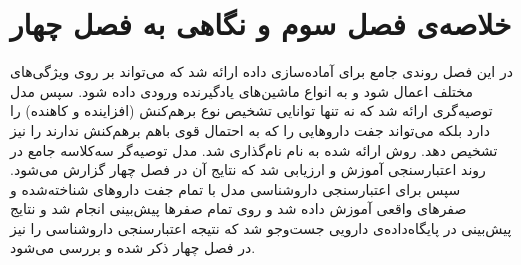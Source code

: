 \section*{خلاصه‌ی فصل سوم و نگاهی به فصل چهار}
در این فصل روندی جامع برای آماده‌سازی داده ارائه ‌شد که می‌تواند بر روی ویژگی‌های مختلف اعمال شود و به انواع ماشین‌های یادگیرنده ورودی داده ‌شود. سپس مدل توصیه‌گری ارائه شد که نه تنها توانایی تشخیص نوع برهم‌کنش (افزاینده و کاهنده) را دارد بلکه می‌تواند جفت داروهایی را که به احتمال قوی باهم برهم‌کنش ندارند را نیز تشخیص دهد. روش ارائه شده به نام 
نام‌گذاری شد. مدل توصیه‌گر سه‌کلاسه جامع در روند اعتبارسنجی آموزش و ارزیابی شد که نتایج آن در فصل چهار گزارش می‌شود. سپس برای اعتبارسنجی داروشناسی مدل با تمام جفت داروهای شناخته‌شده و صفرهای واقعی آموزش داده شد و روی تمام صفرها پیش‌بینی انجام شد و نتایج پیش‌بینی در پایگاه‌داده‌ی دارویی جست‌وجو شد که نتیجه اعتبارسنجی داروشناسی را نیز در فصل چهار ذکر شده و بررسی می‌شود.